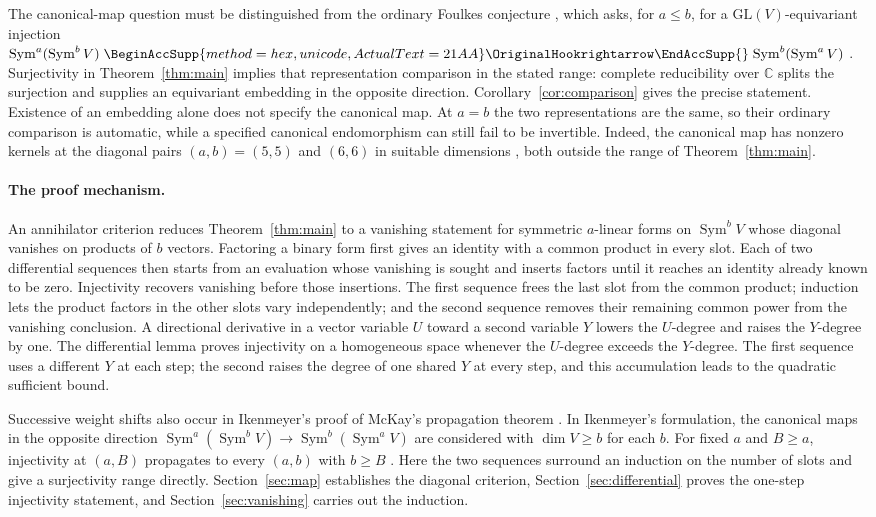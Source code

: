 \documentclass[11pt]{article}
\renewcommand{\hookrightarrow}{\mathrel{
  \BeginAccSupp{method=hex,unicode,ActualText=21AA}
  \OriginalHookrightarrow\EndAccSupp{}}}
\theoremstyle{remark}
\DeclareMathOperator{\Sym}{Sym}
\newcommand{\C}{\mathbb C}
\begin{document}
The canonical-map question must be distinguished from the ordinary
Foulkes conjecture \cite{Foulkes1950}, which asks, for $a\le b$, for a
$\mathrm{GL}(V)$-equivariant injection
$\Sym^a(\Sym^b V)\hookrightarrow\Sym^b(\Sym^a V)$
\cite[Conjecture~2.10]{RSW}.
Surjectivity in Theorem~\ref{thm:main} implies that representation
comparison in the stated range: complete reducibility over $\C$ splits
the surjection and supplies an equivariant embedding in the opposite
direction. Corollary~\ref{cor:comparison} gives the precise statement.
Existence of an embedding alone does not specify the canonical map.
At $a=b$ the two representations are the same, so their ordinary comparison
is automatic, while a specified canonical endomorphism can still fail to be
invertible. Indeed, the canonical map has nonzero kernels at the diagonal pairs
$(a,b)=(5,5)$ and $(6,6)$ in suitable dimensions
\cite[arXiv version, Theorem~6(b),(c) and Remark~7]{CIM}, both outside the range of
Theorem~\ref{thm:main}.

\paragraph{The proof mechanism.}
An annihilator criterion reduces Theorem~\ref{thm:main} to a vanishing
statement for symmetric $a$-linear forms on $\Sym^b V$ whose diagonal
vanishes on products of $b$ vectors. Factoring a binary form first gives an
identity with a common product in every slot. Each of two differential
sequences then starts from an evaluation whose vanishing is sought and
inserts factors until it reaches an identity already known to be zero.
Injectivity recovers vanishing before those insertions. The first sequence
frees the last slot from the common product; induction lets the product
factors in the other slots vary independently; and the second sequence
removes their remaining common power from the vanishing conclusion.
A directional derivative in a vector variable $U$ toward a second variable
$Y$ lowers the $U$-degree and raises the $Y$-degree by one. The differential
lemma proves injectivity on a homogeneous space whenever the $U$-degree
exceeds the $Y$-degree. The first sequence uses a different $Y$ at each step;
the second raises the degree of one shared $Y$ at every step, and this
accumulation leads to the quadratic sufficient bound.

Successive weight shifts also occur in Ikenmeyer's proof
\cite[Section~5]{Ikenmeyer} of McKay's propagation theorem \cite{McKay}.
In Ikenmeyer's formulation, the canonical maps in the opposite direction
$\Sym^a(\Sym^b V)\longrightarrow\Sym^b(\Sym^a V)$ are considered with
$\dim V\ge b$ for each $b$. For fixed $a$ and $B\ge a$, injectivity at
$(a,B)$ propagates to every $(a,b)$ with $b\ge B$
\cite[Theorem~1.3 and Section~3]{Ikenmeyer}.
Here the two sequences surround an induction on the number of slots and
give a surjectivity range directly.
Section~\ref{sec:map} establishes the diagonal criterion,
Section~\ref{sec:differential} proves the one-step injectivity statement,
and Section~\ref{sec:vanishing} carries out the induction.
\end{document}

